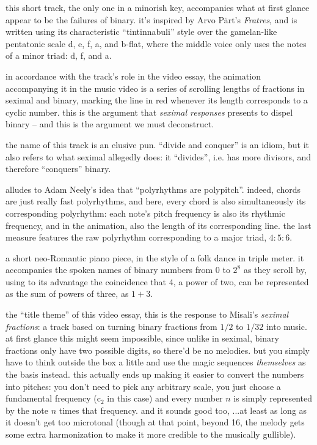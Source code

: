 \documentclass[a4paper, 12pt]{report}
\begin{document}

this short track, the only one in a minorish key, accompanies what at first glance appear to be the failures of binary. it’s inspired by Arvo P\"art’s {\it Fratres}, and is written using its characteristic ``tintinnabuli'' style over the gamelan-like pentatonic scale {\sc d}, {\sc e}, {\sc f}, {\sc a}, and {\sc b}-flat, where the middle voice only uses the notes of a minor triad: {\sc d}, {\sc f}, and {\sc a}.

in accordance with the track's role in the video essay, the animation accompanying it in the music video is a series of scrolling lengths of fractions in seximal and binary, marking the line in red whenever its length corresponds to a cyclic number. this is the argument that {\it seximal responses} presents to dispel binary -- and this is the argument we must deconstruct.

the name of this track is an elusive pun. ``divide and conquer'' is an idiom, but it also refers to what seximal allegedly does: it ``divides'', i.e. has more divisors, and therefore ``conquers'' binary.


alludes to Adam Neely’s idea that ``polyrhythms are polypitch''. indeed, chords are just really fast polyrhythms, and here, every chord is also simultaneously its corresponding polyrhythm: each note's pitch frequency is also its rhythmic frequency, and in the animation, also the length of its corresponding line. the last measure features the raw polyrhythm corresponding to a major triad, $4:5:6$.


a short neo-Romantic piano piece, in the style of a folk dance in triple meter. it accompanies the spoken names of binary numbers from 0 to $2^8$ as they scroll by, using to its advantage the coincidence that 4, a power of two, can be represented as the sum of powers of three, as $1 + 3$.


the ``title theme'' of this video essay, this is the response to Misali’s {\it seximal fractions}: a track based on turning binary fractions from $1/2$ to $1/32$ into music. at first glance this might seem impossible, since unlike in seximal, binary fractions only have two possible digits, so there’d be no melodies. but you simply have to think outside the box a little and use the magic sequences \emph{themselves} as the basis instead. this actually ends up making it easier to convert the numbers into pitches: you don’t need to pick any arbitrary scale, you just choose a fundamental frequency ({\sc c$_2$} in this case) and every number $n$ is simply represented by the note $n$ times that frequency. and it sounds good too, ...at least as long as it doesn’t get too microtonal (though at that point, beyond 16, the melody gets some extra harmonization to make it more credible to the musically gullible).
\end{document}
